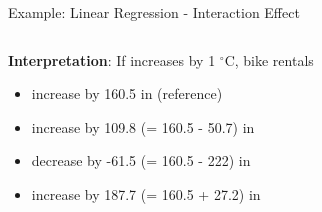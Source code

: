 \documentclass[11pt,compress,t,notes=noshow, aspectratio=169, xcolor=table]{beamer}
\begin{document}
\begin{frame}{Example: Linear Regression - Interaction Effect}
\begin{columns}[T, totalwidth=\linewidth]
\end{columns}
\vfill
\pause
\textbf{Interpretation}: If  increases by 1 $^{\circ}$C, bike rentals
\begin{itemize}[<+->]
    \item increase by 160.5 in  (reference)
    \item increase by 109.8 (= 160.5 - 50.7) in 
    \item decrease by -61.5 (= 160.5 - 222) in 
    \item increase by 187.7 (= 160.5 + 27.2) in 
\end{itemize} %
\end{frame}
\end{document}
